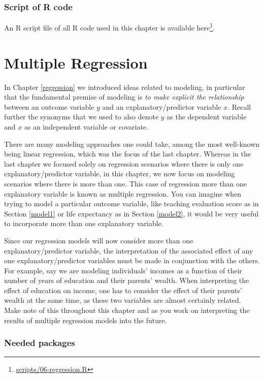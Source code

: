 \documentclass[12pt,]{krantz}
\renewcommand{\href}[2]{#2\footnote{\url{#1}}}
\begin{document}
\subsection{Script of R code}\label{script-of-r-code-3}

An R script file of all R code used in this chapter is available
\href{scripts/06-regression.R}{here}.

\chapter{Multiple Regression}\label{multiple-regression}

In Chapter \ref{regression} we introduced ideas related to modeling, in
particular that the fundamental premise of modeling is \emph{to make
explicit the relationship} between an outcome variable \(y\) and an
explanatory/predictor variable \(x\). Recall further the synonyms that
we used to also denote \(y\) as the dependent variable and \(x\) as an
independent variable or covariate.

There are many modeling approaches one could take, among the most
well-known being linear regression, which was the focus of the last
chapter. Whereas in the last chapter we focused solely on regression
scenarios where there is only one explanatory/predictor variable, in
this chapter, we now focus on modeling scenarios where there is more
than one. This case of regression more than one explanatory variable is
known as multiple regression. You can imagine when trying to model a
particular outcome variable, like teaching evaluation score as in
Section \ref{model1} or life expectancy as in Section \ref{model2}, it
would be very useful to incorporate more than one explanatory variable.

Since our regression models will now consider more than one
explanatory/predictor variable, the interpretation of the associated
effect of any one explanatory/predictor variables must be made in
conjunction with the others. For example, say we are modeling
individuals' incomes as a function of their number of years of education
and their parents' wealth. When interpreting the effect of education on
income, one has to consider the effect of their parents' wealth at the
same time, as these two variables are almost certainly related. Make
note of this throughout this chapter and as you work on interpreting the
results of multiple regression models into the future.

\subsection*{Needed packages}\label{needed-packages-4}
\end{document}
